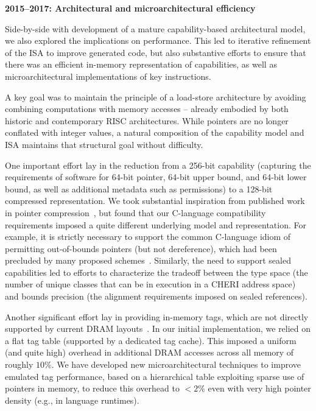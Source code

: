\medskip
\noindent
\textbf{2015--2017: Architectural and microarchitectural efficiency}

\smallskip
\noindent
Side-by-side with development of a mature capability-based architectural
model, we also explored the implications on performance.
This led to iterative refinement of the ISA to improve generated code, but
also substantive efforts to ensure that there was an efficient in-memory
representation of capabilities, as well as microarchitectural implementations
of key instructions.

A key goal was to maintain the principle of a load-store architecture by
avoiding combining computations with memory accesses -- already embodied by
both historic and contemporary RISC architectures.
While pointers are no longer conflated with integer values, a natural
composition of the capability model and ISA maintains that structural goal
without difficulty.

One important effort lay in the reduction from a 256-bit capability (capturing
the requirements of software for 64-bit pointer, 64-bit upper bound, and
64-bit lower bound, as well as additional metadata such as permissions) to a
128-bit compressed representation.
We took substantial inspiration from published work in pointer
compression~\cite{kwon:lowfat}, but found that our C-language compatibility
requirements imposed a quite different underlying model and representation.
For example, it is strictly necessary to support the common C-language idiom
of permitting out-of-bounds pointers (but not dereference), which had been
precluded by many proposed
schemes~\cite{ChisnallCPDP11,Cerberus-PLDI16,davis2019:cheriabi}.
Similarly, the need to support sealed capabilities led to efforts to
characterize the tradeoff between the type space (the number of unique classes
that can be in execution in a CHERI address space) and bounds precision (the
alignment requirements imposed on sealed references).

Another significant effort lay in providing in-memory tags, which are not
directly supported by current DRAM layouts~\cite{joannou2017:tagged-memory, UCAM-CL-TR-936}.
In our initial implementation, we relied on a flat tag table (supported by a
dedicated tag cache).
This imposed a uniform (and quite high) overhead in additional DRAM accesses
across all memory of roughly $10\%$.
We have developed new microarchitectural techniques to improve emulated tag
performance, based on a hierarchical table exploiting sparse use of pointers
in memory, to reduce this overhead to $<2\%$ even with very high pointer
density (e.g., in language runtimes).

